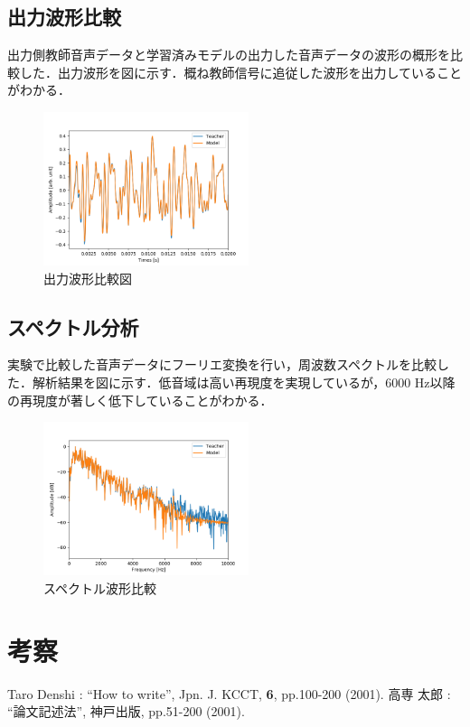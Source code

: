 \documentclass{jarticle}
\begin{document}
\subsection{出力波形比較}
出力側教師音声データと学習済みモデルの出力した音声データの波形の概形を比較した．出力波形を図に示す．概ね教師信号に追従した波形を出力していることがわかる．

\begin{figure}[htbp]
 \begin{center}
  \includegraphics[width=60mm]{gain5_output_hikaku.png}
 \end{center}
 \caption{出力波形比較図}
 \label{fig:one}
\end{figure}

\newpage
\subsection{スペクトル分析}
実験で比較した音声データにフーリエ変換を行い，周波数スペクトルを比較した．解析結果を図に示す．低音域は高い再現度を実現しているが，6000 Hz以降の再現度が著しく低下していることがわかる．

\begin{figure}[htbp]
 \begin{center}
  \includegraphics[width=60mm]{gain5_fft_hikaku.png}
 \end{center}
 \caption{スペクトル波形比較}
 \label{fig:one}
\end{figure}

\section{考察}

\begin{thebibliography}{99}%
Taro Denshi : ``How to write'', Jpn. J. KCCT,
 \textbf{6}, pp.100-200 (2001).
高専 太郎 : ``論文記述法'', 神戸出版, pp.51-200 (2001).
\end{thebibliography}
\end{document}
